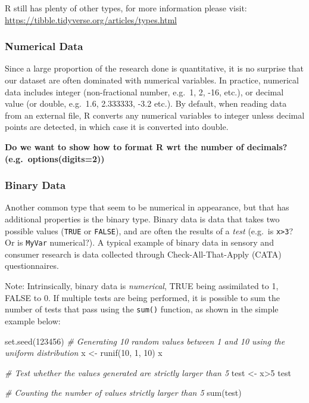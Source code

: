 \documentclass[
]{book}
\newenvironment{Shaded}{\begin{snugshade}}{\end{snugshade}}
\newcommand{\CommentTok}[1]{\textcolor[rgb]{0.56,0.35,0.01}{\textit{#1}}}
\newcommand{\DecValTok}[1]{\textcolor[rgb]{0.00,0.00,0.81}{#1}}
\newcommand{\FunctionTok}[1]{\textcolor[rgb]{0.00,0.00,0.00}{#1}}
\newcommand{\NormalTok}[1]{#1}
\newcommand{\OtherTok}[1]{\textcolor[rgb]{0.56,0.35,0.01}{#1}}
\newcommand{\SpecialCharTok}[1]{\textcolor[rgb]{0.00,0.00,0.00}{#1}}
\begin{document}
R still has plenty of other types, for more information please visit: \url{https://tibble.tidyverse.org/articles/types.html}

\hypertarget{numerical-data}{%
\subsubsection{Numerical Data}\label{numerical-data}}

Since a large proportion of the research done is quantitative, it is no surprise that our dataset are often dominated with numerical variables. In practice, numerical data includes integer (non-fractional number, e.g.~1, 2, -16, etc.), or decimal value (or double, e.g.~1.6, 2.333333, -3.2 etc.).
By default, when reading data from an external file, R converts any numerical variables to integer unless decimal points are detected, in which case it is converted into double.

\textbf{Do we want to show how to format R wrt the number of decimals? (e.g.~options(digits=2))}

\hypertarget{binary-data}{%
\subsubsection{Binary Data}\label{binary-data}}

Another common type that seem to be numerical in appearance, but that has additional properties is the binary type.
Binary data is data that takes two possible values (\texttt{TRUE} or \texttt{FALSE}), and are often the results of a \emph{test} (e.g.~is \texttt{x\textgreater{}3}? Or is \texttt{MyVar} numerical?). A typical example of binary data in sensory and consumer research is data collected through Check-All-That-Apply (CATA) questionnaires.

Note: Intrinsically, binary data is \emph{numerical}, TRUE being assimilated to 1, FALSE to 0. If multiple tests are being performed, it is possible to sum the number of tests that pass using the \texttt{sum()} function, as shown in the simple example below:

\begin{Shaded}
\begin{Highlighting}[]
\FunctionTok{set.seed}\NormalTok{(}\DecValTok{123456}\NormalTok{)}
\CommentTok{\# Generating 10 random values between 1 and 10 using the uniform distribution}
\NormalTok{x }\OtherTok{\textless{}{-}} \FunctionTok{runif}\NormalTok{(}\DecValTok{10}\NormalTok{, }\DecValTok{1}\NormalTok{, }\DecValTok{10}\NormalTok{)}
\NormalTok{x}

\CommentTok{\# Test whether the values generated are strictly larger than 5}
\NormalTok{test }\OtherTok{\textless{}{-}}\NormalTok{ x}\SpecialCharTok{\textgreater{}}\DecValTok{5}
\NormalTok{test}

\CommentTok{\# Counting the number of values strictly larger than 5}
\FunctionTok{sum}\NormalTok{(test)}
\end{Highlighting}
\end{Shaded}
\end{document}
